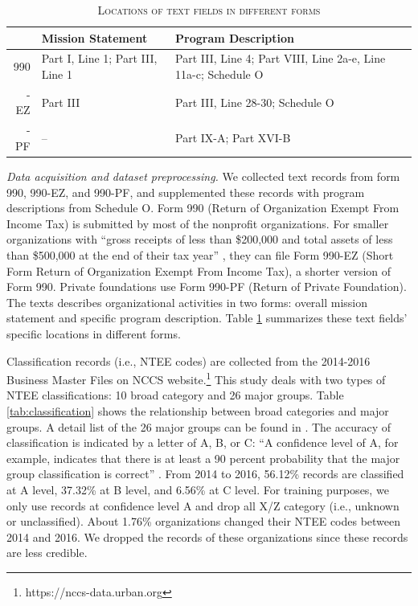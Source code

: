 \documentclass[11pt]{article}
\begin{document}

\begin{table}[]
    \centering
    \begin{tabularx}{\textwidth}{r|X|X}
    	 \hline
         & Mission Statement & Program Description \\
         \hline
         990 & Part I, Line 1; Part III, Line 1 & Part III, Line 4; Part VIII, Line 2a-e, Line 11a-c; Schedule O \\
         \hdashline
         990-EZ & Part III & Part III, Line 28-30; Schedule O \\
         \hdashline
         990-PF & -- & Part IX-A; Part XVI-B \\
         \hline
    \end{tabularx}
    \caption{\textsc{Locations of text fields in different forms}} \label{tab:text_loc}
\end{table}

\textit{Data acquisition and dataset preprocessing.} We collected text records from form 990, 990-EZ, and 990-PF, and supplemented these records with program descriptions from Schedule O. Form 990 (Return of Organization Exempt From Income Tax) is submitted by most of the nonprofit organizations. For smaller organizations with ``gross receipts of less than \$200,000 and total assets of less than \$500,000 at the end of their tax year'' \parencite[1]{USInternalRevenueService2017InstructionsForm2018}, they can file Form 990-EZ (Short Form Return of Organization Exempt From Income Tax), a shorter version of Form 990. Private foundations use Form 990-PF (Return of Private Foundation). The texts describes organizational activities in two forms: overall mission statement and specific program description. Table \ref{tab:text_loc} summarizes these text fields' specific locations in different forms.

Classification records (i.e., NTEE codes) are collected from the 2014-2016 Business Master Files on NCCS website.\footnote{https://nccs-data.urban.org} This study deals with two types of NTEE classifications: 10 broad category and 26 major groups. Table \ref{tab:classification} shows the relationship between broad categories and major groups. A detail list of the 26 major groups can be found in \textcite{USInternalRevenueServiceExemptOrganizationsBusiness2014}. The accuracy of classification is indicated by a letter of A, B, or C: ``A confidence level of A, for example, indicates that there is at least a 90 percent probability that the major group classification is correct'' \parencite[16]{NationalCenterforCharitableStatisticsGuideUsingNCCS2006}. From 2014 to 2016, 56.12\% records are classified at A level, 37.32\% at B level, and 6.56\% at C level. For training purposes, we only use records at confidence level A and drop all X/Z category (i.e., unknown or unclassified). About 1.76\% organizations changed their NTEE codes between 2014 and 2016. We dropped the records of these organizations since these records are less credible.
\end{document}
